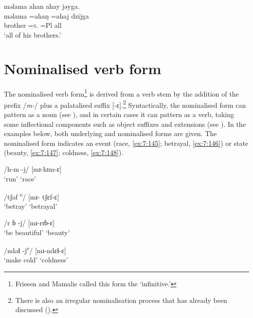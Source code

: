 \medskip
məlama  ahan  ahay  jəyga.\\
\gll məlama  =ahaŋ =ahaj  dzijga\\
     brother =\textsc{s}.{\POSS}  =Pl  all\\
\glt  ‘all of his brothers.’\\
\z 
{}
\section{Nominalised verb form}\label{sec:7.6}
\hypertarget{RefHeading1212401525720847}{}
The nominalised verb form\footnote{Friesen and Mamalis called this form the ‘infinitive.’} is derived from a verb stem by the addition of the prefix /\textit{m-}/ plus a palatalised suffix [{}-ɛ].\footnote{There is also an irregular nominalisation process that has already been discussed ().}  Syntactically, the nominalised form can pattern as a noun (see ), and in certain cases it can pattern as a verb, taking some inflectional components such as object suffixes and extensions (see ). In the examples below, both underlying and nominalised forms are given. The nominalised form indicates an event (race, \ref{ex:7:145};  betrayal, \ref{ex:7:146}) or state (beauty, \ref{ex:7:147};  coldness, \ref{ex:7:148}).  


\ea\label{ex:7:145}
 /h-m -j/ \hspace{40pt}    [mɪ-hɪm-ɛ]\\
\glt ‘run' \hspace{50pt}    ‘race’
\z 

\ea\label{ex:7:146}
/tʃaf \textsuperscript{e}/  \hspace{45pt}  [mɪ- tʃɛf-ɛ]\\
\glt  ‘betray’  \hspace{40pt}   ‘betrayal’
\z 

\ea\label{ex:7:147}
/r ɓ -j/  \hspace{45pt}  [mɪ-rɪɓ-ɛ]\\
\glt  ‘be beautiful’ \hspace{15pt} ‘beauty’
\z 

\ea\label{ex:7:148}
 /ndaɬ -j\textsuperscript{e}/  \hspace{34pt}  [mɪ-ndɛɬ-ɛ]\\
\glt  ‘make cold’ \hspace{25pt}   ‘coldness’
\z 

